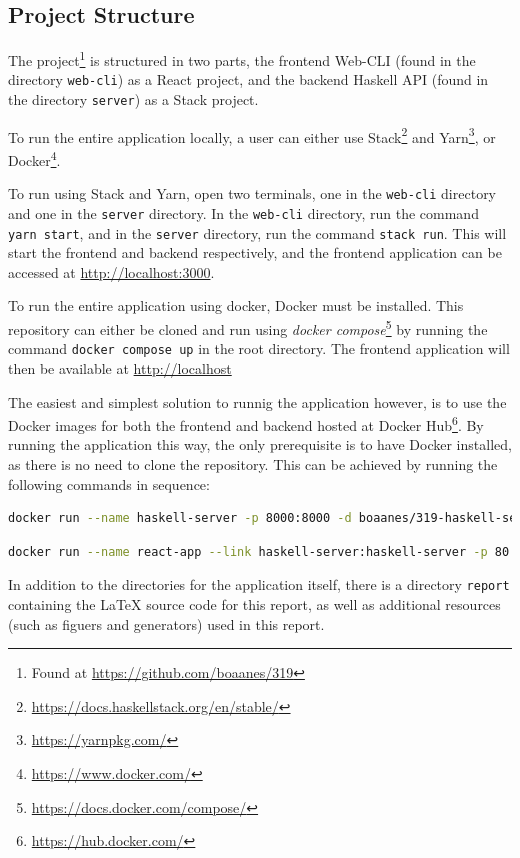 \documentclass[11pt, a4paper]{article}
\begin{document}
\subsection{Project Structure}
\label{sec:projectstructure}
The project\footnote{Found at \url{https://github.com/boaanes/319}} is structured in two parts, the frontend Web-CLI (found in the directory \texttt{web-cli}) as a React project, and the backend Haskell API (found in the directory \texttt{server}) as a Stack project.

To run the entire application locally, a user can either use Stack\footnote{\url{https://docs.haskellstack.org/en/stable/}} and Yarn\footnote{\url{https://yarnpkg.com/}}, or Docker\footnote{\url{https://www.docker.com/}}.

To run using Stack and Yarn, open two terminals, one in the \texttt{web-cli} directory and one in the \texttt{server} directory. In the \texttt{web-cli} directory, run the command \texttt{yarn start}, and in the \texttt{server} directory, run the command \texttt{stack run}. This will start the frontend and backend respectively, and the frontend application can be accessed at \url{http://localhost:3000}.

To run the entire application using docker, Docker must be installed. This repository can either be cloned and run using \textit{docker compose}\footnote{\url{https://docs.docker.com/compose/}} by running the command \texttt{docker compose up} in the root directory. The frontend application will then be available at \url{http://localhost}

The easiest and simplest solution to runnig the application however, is to use the Docker images for both the frontend and backend hosted at Docker Hub\footnote{\url{https://hub.docker.com/}}. By running the application this way, the only 
prerequisite is to have Docker installed, as there is no need to clone the repository. This can be achieved by running the following commands in sequence:

\begin{lstlisting}[language=bash]
docker run --name haskell-server -p 8000:8000 -d boaanes/319-haskell-server
\end{lstlisting}

\begin{lstlisting}[language=bash]
docker run --name react-app --link haskell-server:haskell-server -p 80:80 -d boaanes/319-react-app
\end{lstlisting}

In addition to the directories for the application itself, there is a directory \texttt{report} containing the \LaTeX{} source code for this report, as well as additional resources (such as figuers and generators) used in this report.
\end{document}
